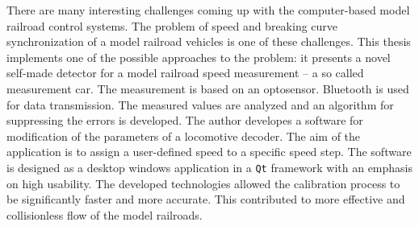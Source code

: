 There are many interesting challenges coming up with the computer-based model
railroad control systems. The problem of speed and breaking curve
synchronization of a model railroad vehicles is one of these challenges. This
thesis implements one of the possible approaches to the problem: it presents a
novel self-made detector for a model railroad speed measurement – a so called
measurement car. The measurement is based on an optosensor. Bluetooth is used
for data transmission. The measured values are analyzed and an algorithm for
suppressing the errors is developed. The author developes a software for
modification of the parameters of a locomotive decoder. The aim of the
application is to assign a user-defined speed to a specific speed step. The
software is designed as a desktop windows application in a \texttt{Qt}
framework with an emphasis on high usability. The developed technologies
allowed the calibration process to be significantly faster and more accurate.
This contributed to more effective and collisionless flow of the model
railroads.
